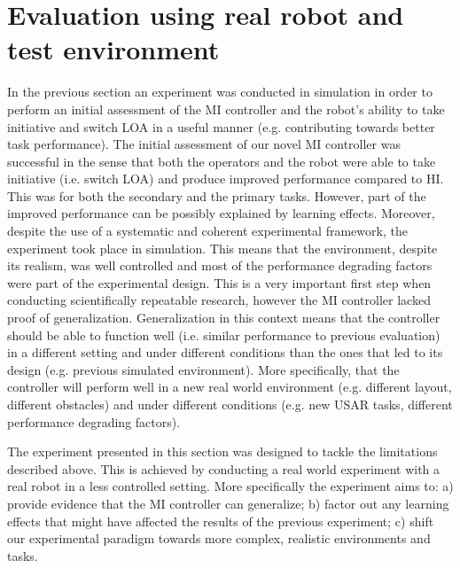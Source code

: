 \documentclass[a4paper,12pt,oneside,openright]{bhamthesis}
\begin{document}
\section{Evaluation using real robot and test environment}
\label{chapter5:experiment3}
In the previous section an experiment was conducted in simulation in order to perform an initial assessment of the MI controller and the robot's ability to take initiative and switch LOA in a useful manner (e.g. contributing towards better task performance). The initial assessment of our novel MI controller was successful in the sense that both the operators and the robot were able to take initiative (i.e. switch LOA) and produce improved performance compared to HI. This was for both the secondary and the primary tasks. However, part of the improved performance can be possibly explained by learning effects. Moreover, despite the use of a systematic and coherent experimental framework, the experiment took place in simulation. This means that the environment, despite its realism, was well controlled and most of the performance degrading factors were part of the experimental design. This is a very important first step when conducting scientifically repeatable research, however the MI controller lacked proof of generalization. Generalization in this context means that the controller should be able to function well (i.e. similar performance to previous evaluation) in a different setting and under different conditions than the ones that led to its design (e.g. previous simulated environment). More specifically, that the controller will perform well in a new real world environment (e.g. different layout, different obstacles) and under different conditions (e.g. new USAR tasks, different performance degrading factors).

The experiment presented in this section was designed to tackle the limitations described above. This is achieved by conducting a real world experiment with a real robot in a less controlled setting. More specifically the experiment aims to: a) provide evidence that the MI controller can generalize; b) factor out any learning effects that might have affected the results of the previous experiment; c) shift our experimental paradigm towards more complex, realistic environments and tasks.
 
\end{document}

